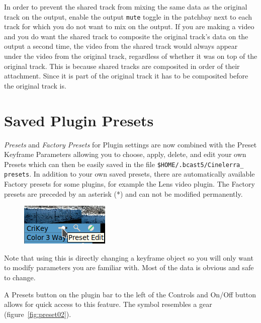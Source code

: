 In order to prevent the shared track from mixing the same data as the original track on the output, enable the output \texttt{mute} toggle in the patchbay next to each track for which you do not want to mix on the output. If you are making a video and you do want the shared track to composite the original track's data on the output a second time, the video from the shared track would always appear under the video from the original track, regardless of whether it was on top of the original track. This is because shared tracks are composited in order of their attachment. Since it is part of the original track it has to be composited before the original track is.

\section{Saved Plugin Presets}%
\label{sec:saved_plugin_preset}

\textit{Presets} and \textit{Factory Presets} for Plugin settings are now combined with the Preset Keyframe Parameters allowing you to choose, apply, delete, and edit your own Presets which can then be easily saved in the file \texttt{\$HOME/.bcast5/Cinelerra\_\\presets}. In addition to your own saved presets, there are automatically available Factory presets for some plugins, for example the Lens video plugin. The Factory presets are preceded by an asterisk (*) and can not be modified permanently.

\begin{figure}
    \vspace{-2ex}
    \centering
    \includegraphics[width=0.7\linewidth]{images/preset.png} 
\end{figure}
Note that using this is directly changing a keyframe object so you will only want to modify parameters you are familiar with. Most of the data is obvious and safe to change.

A Presets button on the plugin bar to the left of the Controls and On/Off button allows for quick access to this feature. The symbol resembles a gear (figure~\ref{fig:preset02}).

